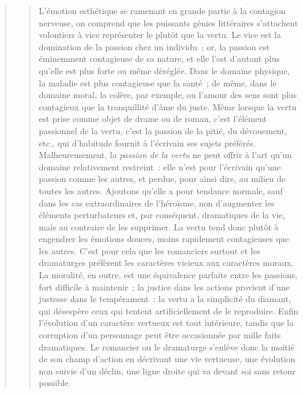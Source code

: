 \documentclass[french,twoside]{book} %
\begin{document}
\begin{verse}
\begin{verse}
L’émotion esthétique se ramenant en grande partie à la contagion nerveuse, on comprend que les puissants génies littéraires s’attachent volontiers à vice représenter le plutôt que la vertu. Le vice est la domination de la passion chez un individu ; or, la passion est éminemment contagieuse de sa nature, et elle l’est d’autant plus qu’elle est plus forte ou même déréglée. Dans le domaine physique, la maladie est plus contagieuse que la santé ; de même, dans le domaine moral, la colère, par exemple, ou l’amour des sens sont plus contagieux que la tranquillité d’âme du juste. Même lorsque la vertu est prise comme objet de drame ou de roman, c’est l’élément passionnel de la vertu, c’est la passion de la pitié, du dévouement, etc., qui d’habitude fournit à l’écrivain ses sujets préférés. Malheureusement, la \emph{passion de la vertu} ne peut offrir à l’art qu’un domaine relativement restreint : elle n’est pour l’écrivain qu’une passion comme les autres, et perdue, pour ainsi dire, au milieu de toutes les autres. Ajoutons qu’elle a pour tendance normale, sauf dans les cas extraordinaires de l’héroïsme, non d’augmenter les éléments perturbateurs et, par conséquent, dramatiques de la vie, mais au contraire de les supprimer. La vertu tend donc plutôt à engendrer les émotions douces, moins rapidement contagieuses que les autres. C’est pour cela que les romanciers surtout et les dramaturges préfèrent les caractères vicieux aux caractères moraux. La moralité, en outre, est une équivalence parfaite entre les passions, fort difficile à maintenir ; la justice dans les actions provient d’une justesse dans le tempérament : la vertu a la simplicité du diamant, qui désespère ceux qui tentent artificiellement de le reproduire. Enfin l’évolution d’un caractère vertueux est tout intérieure, tandis que la corruption d’un personnage peut être occasionnée par mille faits dramatiques. Le romancier ou le dramaturge s’enlève donc la moitié de son champ d’action en décrivant une vie vertueuse, une évolution non suivie d’un déclin, une ligne droite qui va devant soi sans retour possible.\par

\end{verse}
\end{verse}
\end{document}
